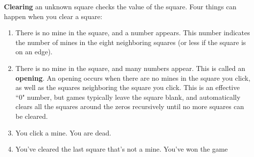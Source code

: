 \textbf{Clearing} an unknown square checks the value of the square. Four things can happen when you clear a square:
\begin{enumerate}
    \item There is no mine in the square, and a number appears. This number indicates the number of mines in the eight neighboring squares (or less if the square is on an edge).
    \item There is no mine in the square, and many numbers appear. This is called an \textbf{opening}. An opening occurs when there are no mines in the square you click, as well as the squares neighboring the square you click. This is an effective ``0" number, but games typically leave the square blank, and automatically clears all the squares around the zeros recursively until no more squares can be cleared.
    \item You click a mine. You are dead.
    \item You've cleared the last square that's not a mine. You've won the game
\end{enumerate}
